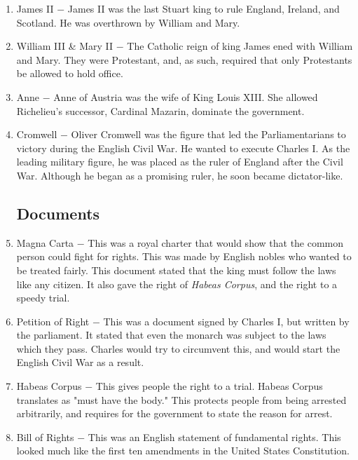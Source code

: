 \documentclass[12pt]{article}
\begin{document}
\begin{enumerate}
\item James II $-$ James II was the last Stuart king to rule England, Ireland, and Scotland. He was overthrown by William and Mary.

\item William III \& Mary II $-$ The Catholic reign of king James ened with William and Mary. They were Protestant, and, as such, required that only Protestants be allowed to hold office.

\item Anne $-$ Anne of Austria was the wife of King Louis XIII. She allowed Richelieu's successor, Cardinal Mazarin, dominate the government.

\item Cromwell $-$ Oliver Cromwell was the figure that led the Parliamentarians to victory during the English Civil War. He wanted to execute Charles I. As the leading military figure, he was placed as the ruler of England after the Civil War. Although he began as a promising ruler, he soon became dictator-like.

\subsection{Documents}

\item Magna Carta $-$ This was a royal charter that would show that the common person could fight for rights. This was made by English nobles who wanted to be treated fairly. This document stated that the king must follow the laws like any citizen. It also gave the right of \textit{Habeas Corpus}, and the right to a speedy trial.

\item Petition of Right $-$ This was a document signed by Charles I, but written by the parliament. It stated that even the monarch was subject to the laws which they pass. Charles would try to circumvent this, and would start the English Civil War as a result.

\item Habeas Corpus $-$ This gives people the right to a trial. Habeas Corpus translates as "must have the body." This protects people from being arrested arbitrarily, and requires for the government to state the reason for arrest.

\item Bill of Rights $-$ This was an English statement of fundamental rights. This looked much like the first ten amendments in the United States Constitution.


\end{enumerate}
\end{document}
